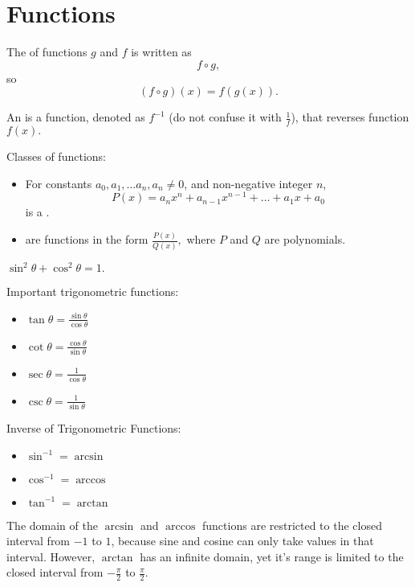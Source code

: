 \section{Functions}
\noindent The  of functions $g$ and $f$ is written as \[f \circ g,\] so \[(f \circ g)(x) = f(g(x)).\]

\bigskip \noindent An  is a function, denoted as $f^{-1}$ (do not confuse it with $\frac{1}{f}$), that reverses function $f(x).$

\bigskip \noindent Classes of functions:
\begin{itemize}
    \item For constants $a_0, a_1, \dots a_n, a_n \neq 0$, and non-negative integer $n$, \[P(x) = a_nx^n + a_{n - 1}x^{n - 1} + \dots + a_1x + a_0\] is a .
    \item {} are functions in the form $\frac{P(x)}{Q(x)},$ where $P$ and $Q$ are polynomials.
\end{itemize}

\begin{proposition}
$\sin^2 \theta + \cos^2 \theta = 1.$
\end{proposition}
Important trigonometric functions:
\begin{itemize}
    \item $\tan \theta = \frac{\sin \theta}{\cos \theta}$
    \item $\cot \theta = \frac{\cos \theta}{\sin \theta}$
    \item $\sec \theta = \frac{1}{\cos \theta}$
    \item $\csc\theta = \frac{1}{\sin \theta}$
\end{itemize}
\begin{center}
\end{center}
Inverse of Trigonometric Functions:
\begin{itemize}
    \item $\sin^{-1} = \arcsin$
    \item $\cos^{-1} = \arccos$
    \item $\tan^{-1} = \arctan$
\end{itemize}
The domain of the $\arcsin$ and $\arccos$ functions are restricted to the closed interval from $-1$ to $1$, because sine and cosine can only take values in that interval. However, $\arctan$ has an infinite domain, yet it's range is limited to the closed interval from $-\frac{\pi}{2}$ to $\frac{\pi}{2}.$

